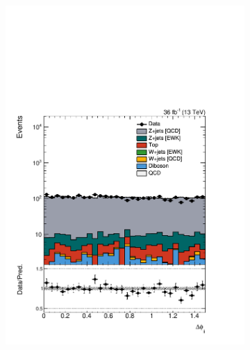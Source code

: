 \begin{figure}[]
\begin{center}
\begin{subfigure}[t]{0.24\textwidth}
            \includegraphics[width=\textwidth]{figures/vbf/prefit/dimuon_jot12DPhi_logy.pdf}
        \end{subfigure}
        \begin{subfigure}[t]{0.24\textwidth}

\end{subfigure}
\end{center}
\end{figure}
